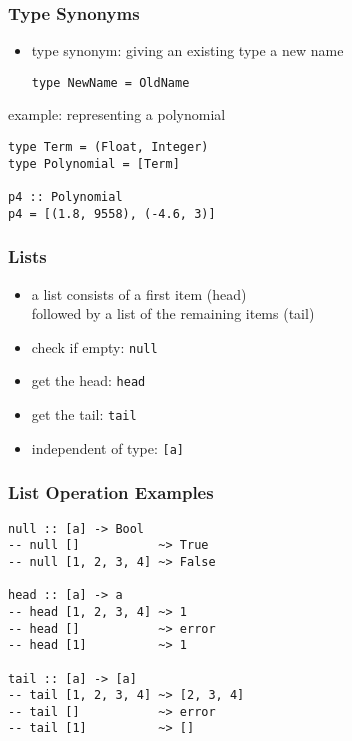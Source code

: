 \documentclass[dvipsnames]{beamer}
\theoremstyle{plain}
\begin{document}
\begin{frame}[fragile]
  \frametitle{Type Synonyms}

  \begin{itemize}
    \item type synonym: giving an existing type a new name
    \smallskip
    \begin{lstlisting}
type NewName = OldName
    \end{lstlisting}
  \end{itemize}

  \pause
  \begin{exampleblock}{example: representing a polynomial}
    \begin{lstlisting}
type Term = (Float, Integer)
type Polynomial = [Term]

p4 :: Polynomial
p4 = [(1.8, 9558), (-4.6, 3)]
    \end{lstlisting}
  \end{exampleblock}
\end{frame}

\begin{frame}
  \frametitle{Lists}

  \begin{itemize}
    \item a list consists of a first item (\alert{head})\\
      followed by a list of the remaining items (\alert{tail})

    \medskip
    \item check if empty: \lstinline|null|
    \item get the head: \lstinline|head|
    \item get the tail: \lstinline|tail|

    \pause
    \medskip
    \item independent of type: \lstinline|[a]|
  \end{itemize}
\end{frame}

\begin{frame}[fragile]
  \frametitle{List Operation Examples}

  \begin{lstlisting}
null :: [a] -> Bool
-- null []           ~> True
-- null [1, 2, 3, 4] ~> False

head :: [a] -> a
-- head [1, 2, 3, 4] ~> 1
-- head []           ~> error
-- head [1]          ~> 1

tail :: [a] -> [a]
-- tail [1, 2, 3, 4] ~> [2, 3, 4]
-- tail []           ~> error
-- tail [1]          ~> []
  \end{lstlisting}
\end{frame}
\end{document}
